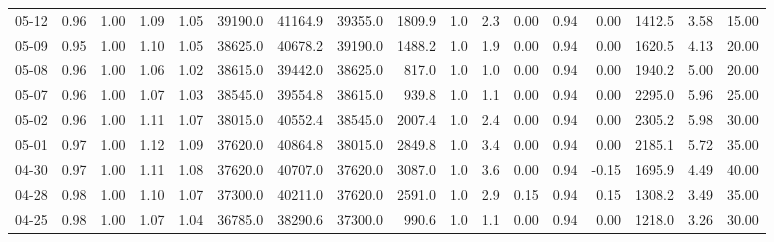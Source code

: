 \begin{threeparttable}
{\begin{tabular}{lrrrrrrrrrrrrrrrr}
  05-12 &         0.96 &           1.00 &          1.09 &          1.05 & 39190.0 & 41164.9 & 39355.0 &     1809.9 &                      1.0 &                 2.3 &       0.00 &      0.94 &           0.00 &           1412.5 &            3.58 &                  15.00 \\
  05-09 &         0.95 &           1.00 &          1.10 &          1.05 & 38625.0 & 40678.2 & 39190.0 &     1488.2 &                      1.0 &                 1.9 &       0.00 &      0.94 &           0.00 &           1620.5 &            4.13 &                  20.00 \\
  05-08 &         0.96 &           1.00 &          1.06 &          1.02 & 38615.0 & 39442.0 & 38625.0 &      817.0 &                      1.0 &                 1.0 &       0.00 &      0.94 &           0.00 &           1940.2 &            5.00 &                  20.00 \\
  05-07 &         0.96 &           1.00 &          1.07 &          1.03 & 38545.0 & 39554.8 & 38615.0 &      939.8 &                      1.0 &                 1.1 &       0.00 &      0.94 &           0.00 &           2295.0 &            5.96 &                  25.00 \\
  05-02 &         0.96 &           1.00 &          1.11 &          1.07 & 38015.0 & 40552.4 & 38545.0 &     2007.4 &                      1.0 &                 2.4 &       0.00 &      0.94 &           0.00 &           2305.2 &            5.98 &                  30.00 \\
  05-01 &         0.97 &           1.00 &          1.12 &          1.09 & 37620.0 & 40864.8 & 38015.0 &     2849.8 &                      1.0 &                 3.4 &       0.00 &      0.94 &           0.00 &           2185.1 &            5.72 &                  35.00 \\
  04-30 &         0.97 &           1.00 &          1.11 &          1.08 & 37620.0 & 40707.0 & 37620.0 &     3087.0 &                      1.0 &                 3.6 &       0.00 &      0.94 &          -0.15 &           1695.9 &            4.49 &                  40.00 \\
  04-28 &         0.98 &           1.00 &          1.10 &          1.07 & 37300.0 & 40211.0 & 37620.0 &     2591.0 &                      1.0 &                 2.9 &       0.15 &      0.94 &           0.15 &           1308.2 &            3.49 &                  35.00 \\
  04-25 &         0.98 &           1.00 &          1.07 &          1.04 & 36785.0 & 38290.6 & 37300.0 &      990.6 &                      1.0 &                 1.1 &       0.00 &      0.94 &           0.00 &           1218.0 &            3.26 &                  30.00 \\

\end{tabular}}
\end{threeparttable}
